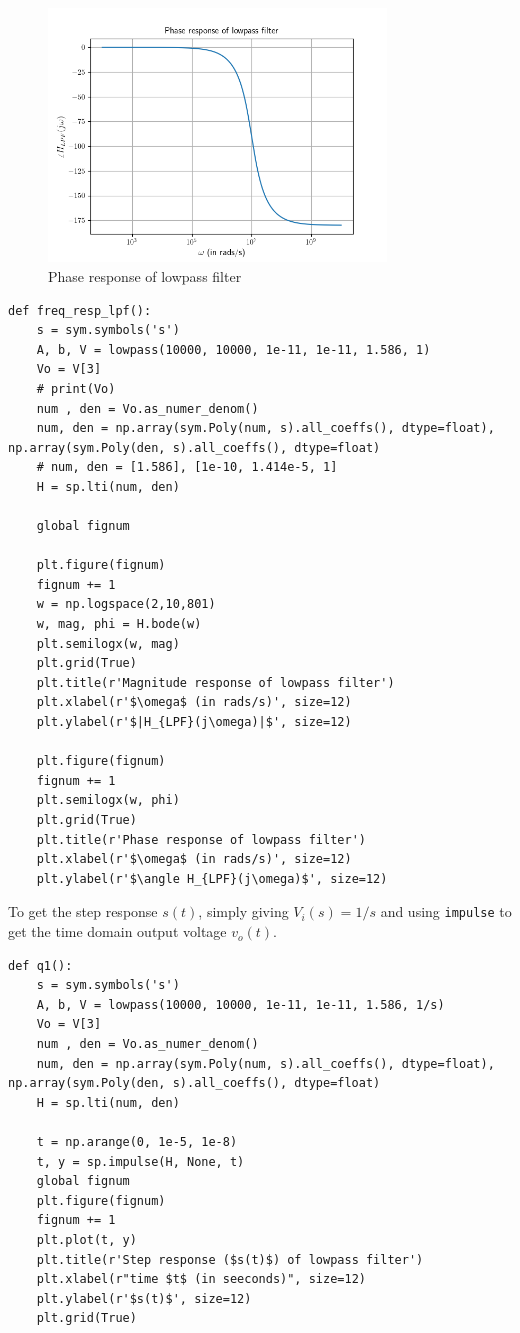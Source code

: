 \documentclass[12pt, a4paper]{article}
\begin{document}
\begin{figure}[H]
\centering
\includegraphics[width=0.8\textwidth]{phaseResLPF.png}
\caption{Phase response of lowpass filter}
\end{figure}

\begin{lstlisting}
def freq_resp_lpf():
    s = sym.symbols('s')
    A, b, V = lowpass(10000, 10000, 1e-11, 1e-11, 1.586, 1)
    Vo = V[3]
    # print(Vo)
    num , den = Vo.as_numer_denom()
    num, den = np.array(sym.Poly(num, s).all_coeffs(), dtype=float), np.array(sym.Poly(den, s).all_coeffs(), dtype=float)
    # num, den = [1.586], [1e-10, 1.414e-5, 1]
    H = sp.lti(num, den)

    global fignum

    plt.figure(fignum)
    fignum += 1
    w = np.logspace(2,10,801)
    w, mag, phi = H.bode(w)
    plt.semilogx(w, mag)
    plt.grid(True)
    plt.title(r'Magnitude response of lowpass filter')
    plt.xlabel(r'$\omega$ (in rads/s)', size=12)
    plt.ylabel(r'$|H_{LPF}(j\omega)|$', size=12)

    plt.figure(fignum)
    fignum += 1
    plt.semilogx(w, phi)
    plt.grid(True)
    plt.title(r'Phase response of lowpass filter')
    plt.xlabel(r'$\omega$ (in rads/s)', size=12)
    plt.ylabel(r'$\angle H_{LPF}(j\omega)$', size=12)
\end{lstlisting}

To get the step response $s(t)$, simply giving $V_i(s) = 1/s$ and using \texttt{impulse} to get the time domain output voltage $v_o(t)$.

\begin{lstlisting}
def q1():
    s = sym.symbols('s')
    A, b, V = lowpass(10000, 10000, 1e-11, 1e-11, 1.586, 1/s)
    Vo = V[3]
    num , den = Vo.as_numer_denom()
    num, den = np.array(sym.Poly(num, s).all_coeffs(), dtype=float), np.array(sym.Poly(den, s).all_coeffs(), dtype=float)
    H = sp.lti(num, den)

    t = np.arange(0, 1e-5, 1e-8)
    t, y = sp.impulse(H, None, t)
    global fignum
    plt.figure(fignum)
    fignum += 1
    plt.plot(t, y)
    plt.title(r'Step response ($s(t)$) of lowpass filter')
    plt.xlabel(r"time $t$ (in seeconds)", size=12)
    plt.ylabel(r'$s(t)$', size=12)
    plt.grid(True)
\end{lstlisting}
\end{document}
